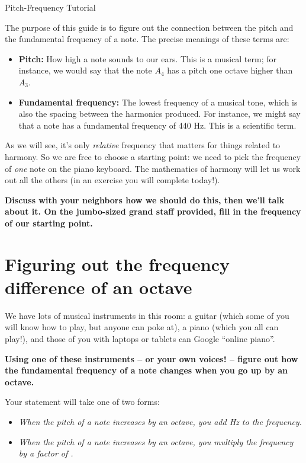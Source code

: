 \documentclass[10pt]{article}
\begin{document}
\begin{center} \Large Pitch-Frequency Tutorial \end{center}

The purpose of this guide is to figure out the connection between the pitch and the fundamental frequency of a note. The precise meanings of these terms are:

\begin{itemize}
  \item {\bf Pitch:} How high a note sounds to our ears. This is a musical term; for instance, we would say that the note $A_4$ has a pitch one octave higher than $A_3$.
  \item {\bf Fundamental frequency:} The lowest frequency of a musical tone, which is also the spacing between the harmonics produced. For instance, we might say that a
    note has a fundamental frequency of 440 Hz. This is a scientific term.
\end{itemize}

As we will see, it's only {\it relative} frequency that matters for things related to harmony. So we are free to choose a starting point: we need to pick the 
frequency of {\it one} note on the piano keyboard. The mathematics of harmony will let us work out all the others (in an exercise you will complete today!).

{\bf Discuss with your neighbors how we should do this, then we'll talk about it. On the jumbo-sized grand staff provided, fill in the frequency of our starting point.}


\vspace{1in}

\section{Figuring out the frequency difference of an octave}

We have lots of musical instruments in this room: a guitar (which some of you will know how to play, but anyone can poke at), a piano (which you all can play!), and those of you with 
laptops or tablets can Google ``online piano''. 

{\bf Using one of these instruments -- or your own voices! -- figure out how the fundamental frequency of a note changes when you go up by an octave.}

Your statement will take one of two forms:

\begin{itemize}
  \item \it When the pitch of a note increases by an octave, you add \underline{\hspace{1in}} Hz to the frequency.
  \item \it When the pitch of a note increases by an octave, you multiply the frequency by a factor of \underline{\hspace{1in}}.
\end{itemize}
\end{document}
